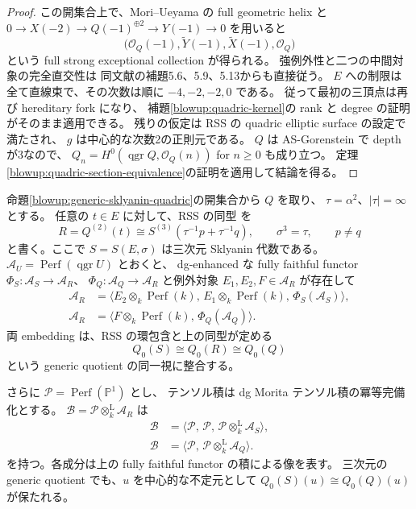 \begin{proof}
この開集合上で、Mori--Ueyama の full geometric helix
\cite[定理5.16]{QuadricMU2021}と
$0\to X(-2)\to Q(-1)^{\oplus2}\to Y(-1)\to0$ を用いると
\[
 \bigl(\mathcal O_Q(-1),\widetilde Y(-1),\widetilde X(-1),\mathcal O_Q\bigr)
\]
という full strong exceptional collection が得られる。
強例外性と二つの中間対象の完全直交性は
同文献の補題5.6、5.9、5.13からも直接従う。
$E$ への制限は全て直線束で、その次数は順に $-4,-2,-2,0$ である。
従って最初の三頂点は再び hereditary fork になり、
補題\ref{blowup:quadric-kernel}の rank と degree の証明がそのまま適用できる。
残りの仮定は RSS の quadric elliptic surface の設定で満たされ、
$g$ は中心的な次数2の正則元である。
$Q$ は AS-Gorenstein で depth が3なので、
$Q_n=H^0(\operatorname{qgr}Q,\mathcal O_Q(n))$ for $n\ge0$ も成り立つ。
定理\ref{blowup:quadric-section-equivalence}の証明を適用して結論を得る。
\end{proof}

\begin{corollary}[共通切断環の二つの分解と三次元の積]
\label{blowup:rss-common-sod}
命題\ref{blowup:generic-sklyanin-quadric}の開集合から $Q$ を取り、
$\tau=\alpha^2$、$|\tau|=\infty$ とする。
任意の $t\in E$ に対して、RSS の同型
\cite[定理7.3]{RSS2023}を
\[
 R=Q^{(2)}(t)
   \cong S^{(3)}(\tau^{-1}p+\tau^{-1}q),
 \qquad \sigma^3=\tau,\qquad p\ne q
\]
と書く。ここで $S=S(E,\sigma)$ は三次元 Sklyanin 代数である。
$\mathcal A_U=\operatorname{Perf}(\operatorname{qgr}U)$ とおくと、
dg-enhanced な fully faithful functor
$\Phi_S\colon\mathcal A_S\to\mathcal A_R$、
$\Phi_Q\colon\mathcal A_Q\to\mathcal A_R$ と例外対象
$E_1,E_2,F\in\mathcal A_R$ が存在して
\begin{align}
 \mathcal A_R
  &=\langle E_2\otimes_k\operatorname{Perf}(k),\,
          E_1\otimes_k\operatorname{Perf}(k),\,
          \Phi_S(\mathcal A_S)\rangle,
       \label{blowup:rss-plane-sod}\\
 \mathcal A_R
  &=\langle F\otimes_k\operatorname{Perf}(k),\,
          \Phi_Q(\mathcal A_Q)\rangle.
       \label{blowup:rss-quadric-sod}
\end{align}
両 embedding は、RSS の環包含と上の同型が定める
\[
 Q_0(S)\cong Q_0(R)\cong Q_0(Q)
\]
という generic quotient の同一視に整合する。

さらに $\mathcal P=\operatorname{Perf}(\mathbb P^1)$ とし、
テンソル積は dg Morita テンソル積の冪等完備化とする。
$\mathcal B=\mathcal P\otimes_k^{\mathrm L}\mathcal A_R$ は
\begin{align}
 \mathcal B
   &=\langle\mathcal P,\,\mathcal P,\,
            \mathcal P\otimes_k^{\mathrm L}\mathcal A_S\rangle,
        \label{blowup:rss-product-plane-sod}\\
 \mathcal B
   &=\langle\mathcal P,\,
            \mathcal P\otimes_k^{\mathrm L}\mathcal A_Q\rangle.
        \label{blowup:rss-product-quadric-sod}
\end{align}
を持つ。各成分は上の fully faithful functor の積による像を表す。
三次元の generic quotient でも、$u$ を中心的な不定元として
$Q_0(S)(u)\cong Q_0(Q)(u)$ が保たれる。
\end{corollary}

